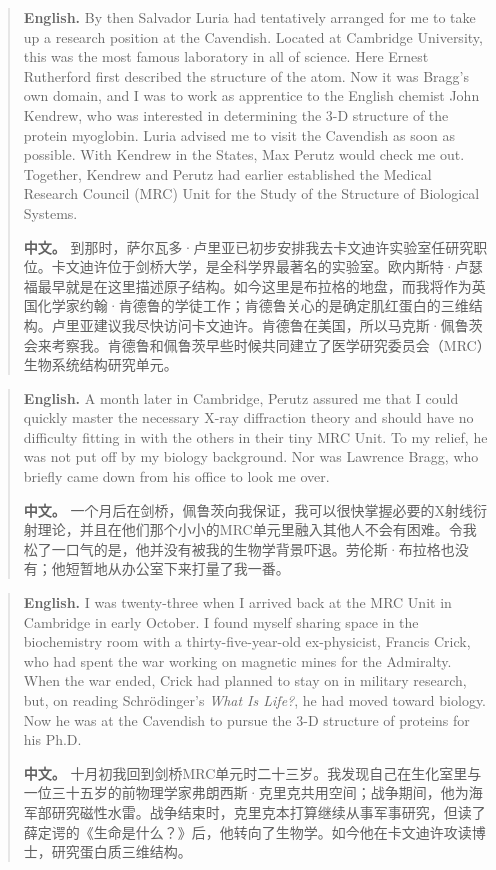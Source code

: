 \begin{quote}
\noindent\textbf{English.} By then Salvador Luria had tentatively arranged for me to take up a research position at the Cavendish. Located at Cambridge University, this was the most famous laboratory in all of science. Here Ernest Rutherford first described the structure of the atom. Now it was Bragg's own domain, and I was to work as apprentice to the English chemist John Kendrew, who was interested in determining the 3-D structure of the protein myoglobin. Luria advised me to visit the Cavendish as soon as possible. With Kendrew in the States, Max Perutz would check me out. Together, Kendrew and Perutz had earlier established the Medical Research Council (MRC) Unit for the Study of the Structure of Biological Systems.

\smallskip
\noindent\textbf{中文。} 到那时，萨尔瓦多·卢里亚已初步安排我去卡文迪许实验室任研究职位。卡文迪许位于剑桥大学，是全科学界最著名的实验室。欧内斯特·卢瑟福最早就是在这里描述原子结构。如今这里是布拉格的地盘，而我将作为英国化学家约翰·肯德鲁的学徒工作；肯德鲁关心的是确定肌红蛋白的三维结构。卢里亚建议我尽快访问卡文迪许。肯德鲁在美国，所以马克斯·佩鲁茨会来考察我。肯德鲁和佩鲁茨早些时候共同建立了医学研究委员会（MRC）生物系统结构研究单元。
\end{quote}

\begin{quote}
\noindent\textbf{English.} A month later in Cambridge, Perutz assured me that I could quickly master the necessary X-ray diffraction theory and should have no difficulty fitting in with the others in their tiny MRC Unit. To my relief, he was not put off by my biology background. Nor was Lawrence Bragg, who briefly came down from his office to look me over.

\smallskip
\noindent\textbf{中文。} 一个月后在剑桥，佩鲁茨向我保证，我可以很快掌握必要的X射线衍射理论，并且在他们那个小小的MRC单元里融入其他人不会有困难。令我松了一口气的是，他并没有被我的生物学背景吓退。劳伦斯·布拉格也没有；他短暂地从办公室下来打量了我一番。
\end{quote}

\begin{quote}
\noindent\textbf{English.} I was twenty-three when I arrived back at the MRC Unit in Cambridge in early October. I found myself sharing space in the biochemistry room with a thirty-five-year-old ex-physicist, Francis Crick, who had spent the war working on magnetic mines for the Admiralty. When the war ended, Crick had planned to stay on in military research, but, on reading Schrödinger's \emph{What Is Life?}, he had moved toward biology. Now he was at the Cavendish to pursue the 3-D structure of proteins for his Ph.D.

\smallskip
\noindent\textbf{中文。} 十月初我回到剑桥MRC单元时二十三岁。我发现自己在生化室里与一位三十五岁的前物理学家弗朗西斯·克里克共用空间；战争期间，他为海军部研究磁性水雷。战争结束时，克里克本打算继续从事军事研究，但读了薛定谔的《生命是什么？》后，他转向了生物学。如今他在卡文迪许攻读博士，研究蛋白质三维结构。
\end{quote}

